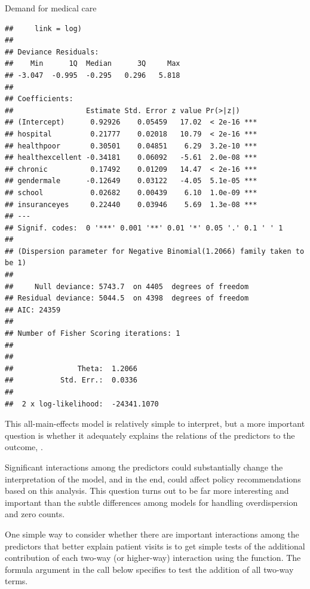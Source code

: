 \documentclass[11pt]{book}\usepackage[]{graphicx}\usepackage[]{color}
\makeatletter
\newenvironment{kframe}{%
 \def\at@end@of@kframe{}%
 \ifinner\ifhmode%
  \def\at@end@of@kframe{\end{minipage}}%
  \begin{minipage}{\columnwidth}%
 \fi\fi%
 \def\FrameCommand##1{\hskip\@totalleftmargin \hskip-\fboxsep
 \colorbox{shadecolor}{##1}\hskip-\fboxsep
     \hskip-\linewidth \hskip-\@totalleftmargin \hskip\columnwidth}%
 \MakeFramed {\advance\hsize-\width
   \@totalleftmargin\z@ \linewidth\hsize
   \@setminipage}}%
 {\par\unskip\endMakeFramed%
 \at@end@of@kframe}
\newenvironment{knitrout}{}{} %
\renewenvironment{knitrout}{\small\renewcommand{\baselinestretch}{.85}}{} %
\makeatother
\begin{document}
\begin{Example}[nmes2]{Demand for medical care}
\begin{knitrout}
\begin{kframe}
\begin{verbatim}
##     link = log)
## 
## Deviance Residuals: 
##    Min      1Q  Median      3Q     Max  
## -3.047  -0.995  -0.295   0.296   5.818  
## 
## Coefficients:
##                 Estimate Std. Error z value Pr(>|z|)    
## (Intercept)      0.92926    0.05459   17.02  < 2e-16 ***
## hospital         0.21777    0.02018   10.79  < 2e-16 ***
## healthpoor       0.30501    0.04851    6.29  3.2e-10 ***
## healthexcellent -0.34181    0.06092   -5.61  2.0e-08 ***
## chronic          0.17492    0.01209   14.47  < 2e-16 ***
## gendermale      -0.12649    0.03122   -4.05  5.1e-05 ***
## school           0.02682    0.00439    6.10  1.0e-09 ***
## insuranceyes     0.22440    0.03946    5.69  1.3e-08 ***
## ---
## Signif. codes:  0 '***' 0.001 '**' 0.01 '*' 0.05 '.' 0.1 ' ' 1
## 
## (Dispersion parameter for Negative Binomial(1.2066) family taken to be 1)
## 
##     Null deviance: 5743.7  on 4405  degrees of freedom
## Residual deviance: 5044.5  on 4398  degrees of freedom
## AIC: 24359
## 
## Number of Fisher Scoring iterations: 1
## 
## 
##               Theta:  1.2066 
##           Std. Err.:  0.0336 
## 
##  2 x log-likelihood:  -24341.1070
\end{verbatim}
\end{kframe}
\end{knitrout}

This all-main-effects model is relatively
simple to interpret, but a more important question is whether it
adequately explains the relations of the predictors to the outcome,
.

Significant interactions among the predictors could substantially change
the interpretation of the model, and in the end, could affect policy
recommendations based on this analysis. This question turns out to be
far more interesting and important than the subtle differences among
models for handling overdispersion and zero counts.

One simple way to consider whether there are important interactions
among the predictors that better explain patient visits is to get simple
tests of the additional contribution of each two-way (or higher-way)
interaction using the  function.  The formula argument in
the call below specifies to test the addition of all two-way terms.


\end{Example}
\end{document}

